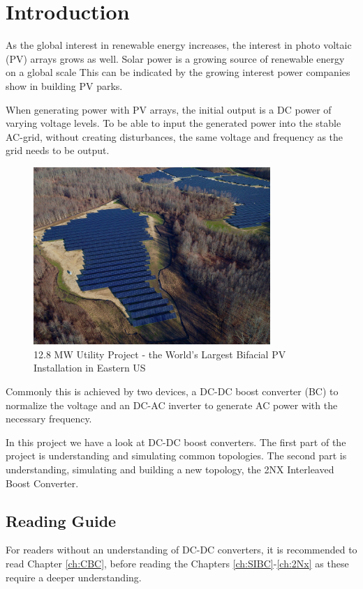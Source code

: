 \chapter{Introduction}\label{ch:introduction}

As the global interest in renewable energy increases,
the interest in photo voltaic (PV) arrays grows as well. 
Solar power is a growing source of renewable energy on a global scale \cite{Timetosh94:online}
This can be indicated by the growing interest power companies show in building PV parks. 
\cite{GSR2018:online}

When generating power with PV arrays,
the initial output is a DC power of varying voltage levels. 
To be able to input the generated power into the stable AC-grid,
without creating disturbances,
the same voltage and frequency as the grid needs to be output. 

\begin{figure}[H]
   \centering
   \includegraphics[width=0.8\textwidth]{figures/Problem/solarpark.jpg}
    \caption{12.8 MW Utility Project - the World's Largest Bifacial PV Installation in Eastern US \cite{Sunpreme29:online}}
	\label{fig:SolarPark}
\end{figure}
Commonly this is achieved by two devices,
a DC-DC boost converter (BC) to normalize the voltage
and an DC-AC inverter to generate AC power with the necessary frequency.

In this project we have a look at DC-DC boost converters.
The first part of the project is understanding and simulating common topologies.
The second part is understanding, simulating and building a new topology,
the 2NX Interleaved Boost Converter. \cite{Bhaskar2016}


\section*{Reading Guide}
For readers without an understanding of DC-DC converters,
it is recommended to read Chapter \ref{ch:CBC},
before reading the Chapters \ref{ch:SIBC}-\ref{ch:2Nx}
as these require a deeper understanding.